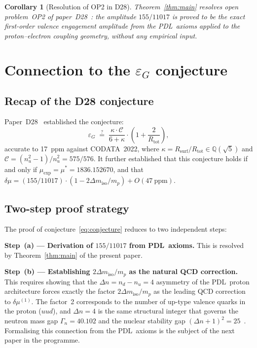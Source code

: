 \documentclass[11pt,a4paper]{article}
\newtheorem{corollary}[theorem]{Corollary}
\theoremstyle{definition}
\newcommand{\PDL}{\textnormal{PDL}}
\newcommand{\Rsurf}{R_{\mathrm{surf}}}
\newcommand{\Rtot}{R_{\mathrm{tot}}}
\newcommand{\epsg}{\varepsilon_G}
\newcommand{\muexp}{\mu_{\mathrm{exp}}}
\newcommand{\dmu}{\delta\mu}
\newcommand{\dmiso}{\Delta m_{\mathrm{iso}}}
\begin{document}
\begin{corollary}[Resolution of OP2 in D28]
\label{cor:OP2}
Theorem~\ref{thm:main} resolves open problem~OP2 of paper~D28~\cite{PDL_D28_2026}: the amplitude $155/11017$ is proved to be the exact first-order valence engagement amplitude from the \PDL\ axioms applied to the proton--electron coupling geometry, without any empirical input.
\end{corollary}

\section{Connection to the \texorpdfstring{$\epsg$}{epsilon\_G} conjecture}
\label{sec:open}

\subsection{Recap of the D28 conjecture}

Paper~D28~\cite{PDL_D28_2026} established the conjecture:
\begin{equation}
\label{eq:conjecture}
\epsg \;\overset{?}{=}\; \frac{\kappa\cdot\mathcal{C}}{6+\kappa}\cdot\left(1+\frac{2}{\Rtot}\right),
\end{equation}
accurate to 17~ppm against CODATA~2022, where $\kappa = \Rsurf/\Rtot \in \mathbb{Q}(\sqrt{5})$ and $\mathcal{C} = (n_u^2-1)/n_u^2 = 575/576$. It further established that this conjecture holds if and only if $\muexp = \mu^* = 1836.152670$, and that $\dmu = (155/11017)\cdot(1 - 2\dmiso/m_p) + O(47~\mathrm{ppm})$.

\subsection{Two-step proof strategy}

The proof of conjecture~\eqref{eq:conjecture} reduces to two independent steps:

\medskip\noindent\textbf{Step~(a) --- Derivation of $155/11017$ from \PDL\ axioms.} This is resolved by Theorem~\ref{thm:main} of the present paper.

\medskip\noindent\textbf{Step~(b) --- Establishing $2\dmiso/m_p$ as the natural QCD correction.} This requires showing that the $\Delta n = n_d - n_u = 4$ asymmetry of the \PDL\ proton architecture forces exactly the factor $2\dmiso/m_p$ as the leading QCD correction to $\dmu^{(1)}$. The factor~2 corresponds to the number of up-type valence quarks in the proton ($uud$), and $\Delta n = 4$ is the same structural integer that governs the neutron mass gap $\Gamma_n = 40.102$ and the nuclear stability gap $(\Delta n+1)^2 = 25$~\cite{Nuclear_Stability_PDL_2026,PDL_D27_2026}. Formalising this connection from the \PDL\ axioms is the subject of the next paper in the programme.
\end{document}
